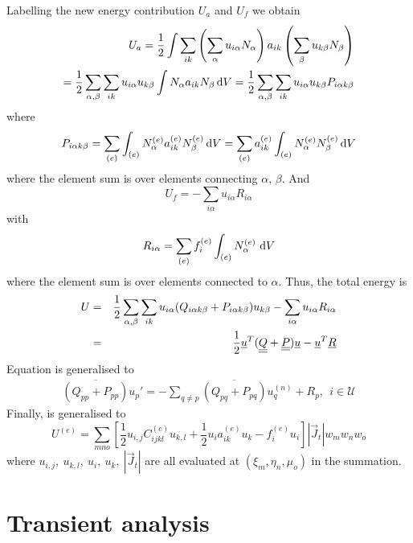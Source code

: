 \documentclass[a4paper]{article}
\begin{document}
Labelling the new energy contribution $U_a$ and $U_f$ we obtain
\begin{eqnarray}
  U_a=\frac12\int\sum_{ik}\left(\sum_{\alpha}u_{i\alpha}N_\alpha\right)
a_{ik}\left(\sum_{\beta}u_{k\beta}N_\beta\right)\\
=\frac12\sum_{\alpha,\beta}\sum_{ik}u_{i\alpha}u_{k\beta}
\int N_\alpha a_{ik} N_\beta\,\mathrm{d} V
=\frac12\sum_{\alpha,\beta}\sum_{ik}u_{i\alpha}u_{k\beta}P_{i\alpha k\beta}
\end{eqnarray}
where
\begin{equation}
  P_{i\alpha k\beta}=
\sum_{(e)}\int_{(e)} 
N_\alpha^{(e)}a_{ik}^{(e)}
N_\beta^{(e)}\,\mathrm{d} V
=\sum_{(e)}a_{ik}^{(e)} \int_{(e)} N_\alpha^{(e)} N_\beta^{(e)}\,\mathrm{d} V
\end{equation}
where the element sum is over elements connecting $\alpha$,
$\beta$. And
\begin{equation}
  U_f=-\sum_{i\alpha} u_{i\alpha} R_{i\alpha}
\end{equation}
with
\begin{equation}
  R_{i\alpha}=\sum_{(e)} f_i^{(e)}\int_{(e)}N_\alpha^{(e)}~\mathrm{d} V
\end{equation}
where the element sum is over elements connected to $\alpha$.
Thus, the total energy is
\begin{eqnarray}
  U&=&\frac12\sum_{\alpha,\beta}\sum_{ik}u_{i\alpha}
(Q_{i\alpha k\beta}+P_{i\alpha k\beta})u_{k\beta}
-\sum_{i\alpha} u_{i\alpha}R_{i\alpha}\\
   &=&\frac12{\underline{u}}^T (\underline{\underline{Q}}+\underline{\underline{P}}){\underline{u}}-{\underline{u}}^T{\underline{R}}
\end{eqnarray}
Equation  is generalised to
\begin{eqnarray}
  \overline{(Q_{pp}+P_{pp})} u_p'
=-\sum_{q\ne p} \overline{(Q_{pq}+P_{pq})} u_q^{(n)}+R_p,~~i\in\mathcal U
\end{eqnarray}
Finally,  is generalised to
\begin{equation}
  U^{(e)}=\sum_{mno}
\left[\frac12 u_{i,j}C_{ijkl}^{(e)}u_{k,l}
+\frac12 u_i a_{ik}^{(e)} u_k-f_i^{(e)} u_i\right]
|\vec J_t|w_m w_n w_o
\end{equation}
where $u_{i,j},~u_{k,l},~u_i,~u_k,~|\vec J_t|$ are all evaluated at
$(\xi_m,\eta_n,\mu_o)$ in the summation.

\section{Transient analysis}
\label{trans}
\end{document}

